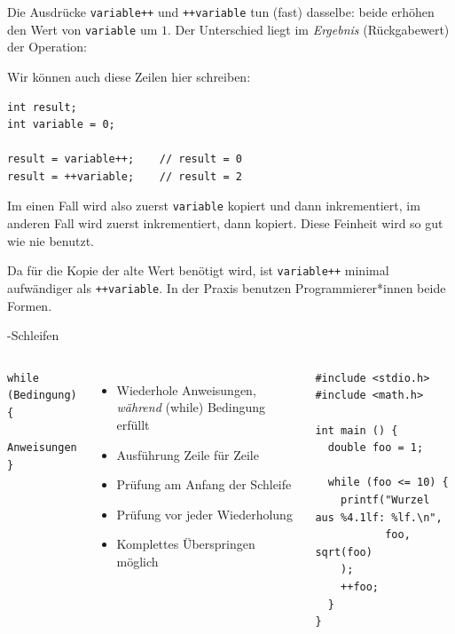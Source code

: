 \begin{frame}[fragile]
%
\begin{hintbox}
\small
Die Ausdrücke \texttt{variable++} und \texttt{++variable} tun (fast) dasselbe: beide erhöhen den Wert von \texttt{variable} um $1$. Der Unterschied liegt im \emph{Ergebnis} (Rückgabewert) der Operation:

\vspace{3pt}
Wir können auch diese Zeilen hier schreiben:

\begin{verbatim}
int result;
int variable = 0;

result = variable++;    // result = 0
result = ++variable;    // result = 2
\end{verbatim}

Im einen Fall wird also zuerst \texttt{variable} kopiert und dann inkrementiert, im anderen Fall wird zuerst inkrementiert, dann kopiert. Diese Feinheit wird so gut wie nie benutzt.

\vspace{3pt}
Da für die Kopie der alte Wert benötigt wird, ist \texttt{variable++} minimal aufwändiger als \texttt{++variable}. In der Praxis benutzen Programmierer*innen beide Formen.
\end{hintbox}
%
\end{frame}


\begin{frame}[fragile]{-Schleifen}
%
\begin{columns}[T]
\begin{codebox}[Syntax]
\begin{verbatim}
while (Bedingung) {
  Anweisungen
}
\end{verbatim}
%
\end{codebox}
\begin{itemize}
\item Wiederhole Anweisungen, \emph{während} (while) Bedingung erfüllt
\item Ausführung Zeile für Zeile
\item Prüfung am Anfang der Schleife
\item Prüfung vor jeder Wiederholung
\item Komplettes Überspringen möglich
\end{itemize}
%
\begin{codebox}
\begin{verbatim}
#include <stdio.h>
#include <math.h>

int main () {
  double foo = 1;

  while (foo <= 10) {
    printf("Wurzel aus %4.1lf: %lf.\n", 
           foo, sqrt(foo)
    );
    ++foo;
  }
}
\end{verbatim}
\end{codebox}
\end{columns}
%
\end{frame}

